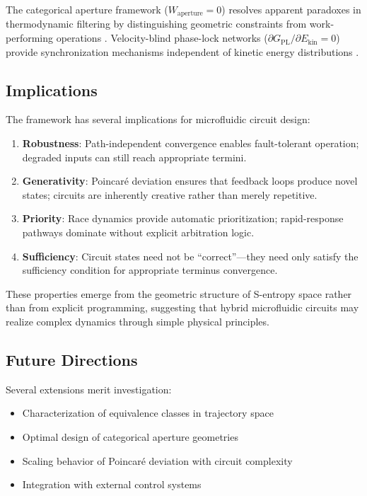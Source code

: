 \documentclass[aps,prl,twocolumn,superscriptaddress,showpacs]{revtex4-2}
\newcommand{\Gfree}{G_{\text{PL}}}
\newcommand{\Ekin}{E_{\text{kin}}}
\newcommand{\Wapert}{W_{\text{aperture}}}
\begin{document}
The categorical aperture framework ($\Wapert = 0$) resolves apparent paradoxes in thermodynamic filtering by distinguishing geometric constraints from work-performing operations \cite{landauer1961irreversibility, bennett1982thermodynamics}. Velocity-blind phase-lock networks ($\partial \Gfree / \partial \Ekin = 0$) provide synchronization mechanisms independent of kinetic energy distributions \cite{pikovsky2001synchronization}.

\subsection{Implications}

The framework has several implications for microfluidic circuit design:

\begin{enumerate}
\item \textbf{Robustness}: Path-independent convergence enables fault-tolerant operation; degraded inputs can still reach appropriate termini.

\item \textbf{Generativity}: Poincar\'{e} deviation ensures that feedback loops produce novel states; circuits are inherently creative rather than merely repetitive.

\item \textbf{Priority}: Race dynamics provide automatic prioritization; rapid-response pathways dominate without explicit arbitration logic.

\item \textbf{Sufficiency}: Circuit states need not be ``correct''---they need only satisfy the sufficiency condition for appropriate terminus convergence.
\end{enumerate}

These properties emerge from the geometric structure of S-entropy space rather than from explicit programming, suggesting that hybrid microfluidic circuits may realize complex dynamics through simple physical principles.

\subsection{Future Directions}

Several extensions merit investigation:
\begin{itemize}
\item Characterization of equivalence classes in trajectory space
\item Optimal design of categorical aperture geometries
\item Scaling behavior of Poincar\'{e} deviation with circuit complexity
\item Integration with external control systems
\end{itemize}
\end{document}
